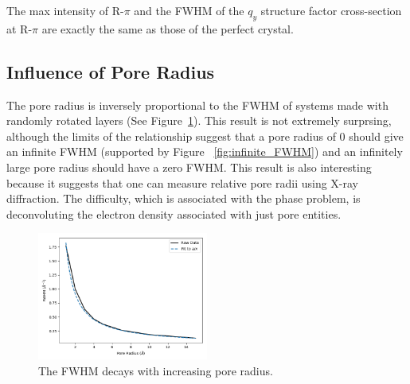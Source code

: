 \documentclass{article}
\begin{document}
  The max intensity of R-$\pi$ and the FWHM of the $q_y$ structure factor
  cross-section at R-$\pi$ are exactly the same as those of the perfect crystal. 
 
  \subsection{Influence of Pore Radius}

  The pore radius is inversely proportional to the FWHM of systems made with
  randomly rotated layers (See Figure~\ref{fig:pore_radius}). This result is
  not extremely surprsing, although the limits of the relationship suggest 
  that a pore radius of 0 should give an infinite FWHM (supported by Figure
  ~\ref{fig:infinite_FWHM}) and an infinitely large pore radius should have 
  a zero FWHM. This result is also interesting because it suggests that one
  can measure relative pore radii using X-ray diffraction. The difficulty,
  which is associated with the phase problem, is deconvoluting the electron
  density associated with just pore entities.   

  \begin{figure}[!htb]
  \centering
  \includegraphics[width=0.5\textwidth]{pore_radius_FWHM.png}
  \caption{The FWHM decays with increasing pore radius.}\label{fig:pore_radius}
  \end{figure}
\end{document}
